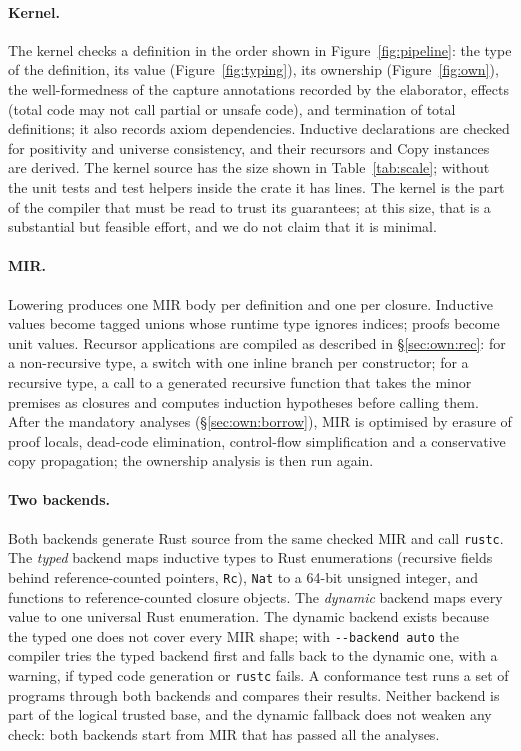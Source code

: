\paragraph{Kernel.}
The kernel checks a definition in the order shown in Figure~\ref{fig:pipeline}: the type of the definition, its value (Figure~\ref{fig:typing}), its ownership (Figure~\ref{fig:own}), the well-formedness of the capture annotations recorded by the elaborator, effects (total code may not call partial or unsafe code), and termination of total definitions; it also records axiom dependencies.
Inductive declarations are checked for positivity and universe consistency, and their recursors and Copy instances are derived.
The kernel source has the size shown in Table~\ref{tab:scale}; without the unit tests and test helpers inside the crate it has \NumKernelNonTestLines{} lines.
The kernel is the part of the compiler that must be read to trust its guarantees; at this size, that is a substantial but feasible effort, and we do not claim that it is minimal.

\paragraph{MIR.}
Lowering produces one MIR body per definition and one per closure.
Inductive values become tagged unions whose runtime type ignores indices; proofs become unit values.
Recursor applications are compiled as described in \S\ref{sec:own:rec}: for a non-recursive type, a switch with one inline branch per constructor; for a recursive type, a call to a generated recursive function that takes the minor premises as closures and computes induction hypotheses before calling them.
After the mandatory analyses (\S\ref{sec:own:borrow}), MIR is optimised by erasure of proof locals, dead-code elimination, control-flow simplification and a conservative copy propagation; the ownership analysis is then run again.

\paragraph{Two backends.}
Both backends generate Rust source from the same checked MIR and call \texttt{rustc}.
The \emph{typed} backend maps inductive types to Rust enumerations (recursive fields behind reference-counted pointers, \lstinline|Rc|), \lstinline|Nat| to a 64-bit unsigned integer, and functions to reference-counted closure objects.
The \emph{dynamic} backend maps every value to one universal Rust enumeration.
The dynamic backend exists because the typed one does not cover every MIR shape; with \texttt{-{}-backend auto} the compiler tries the typed backend first and falls back to the dynamic one, with a warning, if typed code generation or \texttt{rustc} fails.
A conformance test runs a set of programs through both backends and compares their results.
Neither backend is part of the logical trusted base, and the dynamic fallback does not weaken any check: both backends start from MIR that has passed all the analyses.

